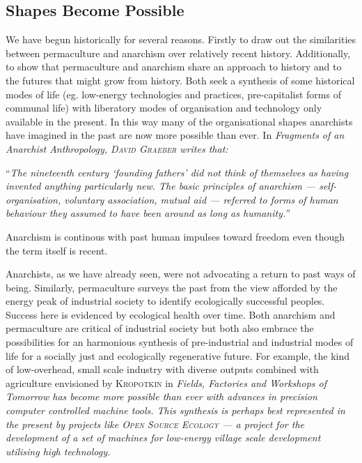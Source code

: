 \documentclass[a4paper, 11pt]{article}
\begin{document}
\begin{multicols*}{2}
\section*{Shapes Become Possible}
We have begun historically for several reasons.  Firstly to draw out the similarities between permaculture and anarchism over relatively recent history.  Additionally, to show that permaculture and anarchism share an approach to history and to the futures that might grow from history.  Both seek a synthesis of some historical modes of life (eg. low-energy technologies and practices, pre-capitalist forms of communal life) with liberatory modes of organisation and technology only available in the present.  In this way many of the organisational shapes anarchists have imagined in the past are now more possible than ever.  In \em{Fragments of an Anarchist Anthropology}\em, \textsc{David Graeber} writes that:

\vspace{1mm}
``\em{The nineteenth century `founding fathers' did not think of themselves as having invented anything particularly new.  The basic principles of anarchism --- self-organisation, voluntary association, mutual aid --- referred to forms of human behaviour they assumed to have been around as long as humanity.}\em''
\vspace{1mm}

Anarchism is continous with past human impulses toward freedom even though the term itself is recent.

Anarchists, as we have already seen, were not advocating a return to past ways of being.  Similarly, permaculture surveys the past from the view afforded by the energy peak of industrial society to identify ecologically successful peoples.  Success here is evidenced by ecological health over time.  Both anarchism and permaculture are critical of industrial society but both also embrace the possibilities for an harmonious synthesis of pre-industrial and industrial modes of life for a socially just and ecologically regenerative future.  For example, the kind of low-overhead, small scale industry with diverse outputs combined with agriculture envisioned by \textsc{Kropotkin} in \em{Fields, Factories and Workshops of Tomorrow }\em has become more possible than ever with advances in precision computer controlled machine tools.  This synthesis is perhaps best represented in the present by projects like \textsc{Open Source Ecology} --- a project for the development of a set of machines for low-energy village scale development utilising high technology.


\end{multicols*}
\end{document}
